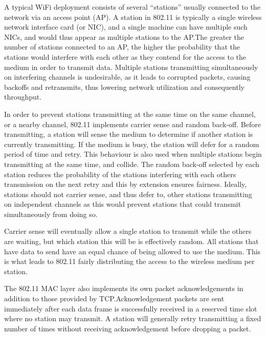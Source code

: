 A typical WiFi deployment consists of several ``stations'' usually connected to
the network via an access point (AP). A station in 802.11 is typically a single
wireless network interface card (or NIC), and a single machine can have multiple
such NICs, and would thus appear as multiple stations to the AP.\@ The greater
the number of stations connected to an AP, the higher the probability that the
stations would interfere with each other as they contend for the access to the
medium in order to transmit data. Multiple stations transmitting simultaneously
on interfering channels is undesirable, as it leads to corrupted packets,
causing backoffs and retransmits, thus lowering network utilization and
consequently throughput.

In order to prevent stations transmitting at the same time on the same channel,
or a nearby channel, 802.11 implements carrier sense and random back-off. Before
transmitting, a station will sense the medium to determine if another station is
currently transmitting. If the medium is busy, the station will defer for a
random period of time and retry. This behaviour is also used when multiple
stations begin transmitting at the same time, and collide. The random back-off
selected by each station reduces the probability of the stations interfering
with each others transmission on the next retry and this by extension ensures
fairness. Ideally, stations should not carrier sense, and thus defer to, other
stations transmitting on independent channels as this would prevent stations
that could transmit simultaneously from doing so.

Carrier sense will eventually allow a single station to transmit while the
others are waiting, but which station this will be is effectively random. All
stations that have data to send have an equal chance of being allowed to use the
medium. This is what leads to 802.11 fairly distributing the access to the
wireless medium per station.

The 802.11 MAC layer also implements its own packet acknowledgements in addition
to those provided by TCP.\@ Acknowledgement packets are sent immediately after
each data frame is successfully received in a reserved time slot where no station
may transmit. A station will generally retry transmitting a fixed number of times
without receiving acknowledgement before dropping a packet.

